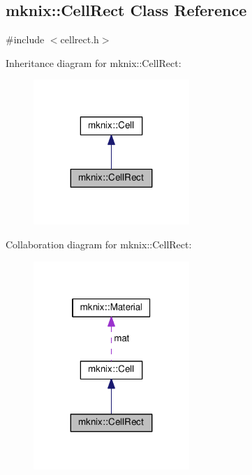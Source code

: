 \hypertarget{classmknix_1_1_cell_rect}{}\subsection{mknix\+:\+:Cell\+Rect Class Reference}
\label{classmknix_1_1_cell_rect}


{\ttfamily \#include $<$cellrect.\+h$>$}



Inheritance diagram for mknix\+:\+:Cell\+Rect\+:\nopagebreak
\begin{figure}[H]
\begin{center}
\leavevmode
\includegraphics[width=167pt]{d4/dac/classmknix_1_1_cell_rect__inherit__graph}
\end{center}
\end{figure}


Collaboration diagram for mknix\+:\+:Cell\+Rect\+:\nopagebreak
\begin{figure}[H]
\begin{center}
\leavevmode
\includegraphics[width=167pt]{d3/db0/classmknix_1_1_cell_rect__coll__graph}
\end{center}
\end{figure}
